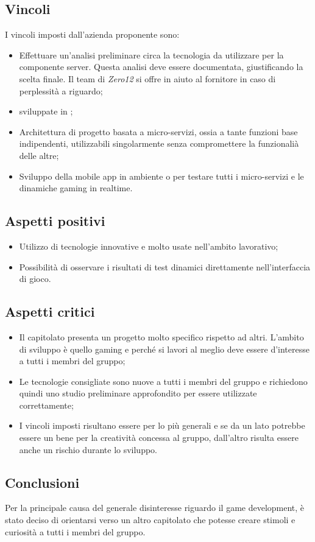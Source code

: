 \subsection{Vincoli}
I vincoli imposti dall'azienda proponente sono:
\begin{itemize}
\item Effettuare un'analisi preliminare circa la tecnologia da utilizzare per la componente server. Questa analisi deve essere documentata, giustificando la scelta finale. Il team di \textit{Zero12} si offre in aiuto al fornitore in caso di perplessità a riguardo;
\item {} sviluppate in ;
\item Architettura di progetto basata a micro-servizi, ossia a tante funzioni base indipendenti, utilizzabili singolarmente senza compromettere la funzionalià delle altre;
\item Sviluppo della mobile app in ambiente  o  per testare tutti i micro-servizi e le dinamiche gaming in realtime. 
\end{itemize}

\subsection{Aspetti positivi}
\begin{itemize}
\item Utilizzo di tecnologie innovative e molto usate nell'ambito lavorativo;
\item Possibilità di osservare i risultati di test dinamici direttamente nell'interfaccia di gioco.
\end{itemize}

\subsection{Aspetti critici}
\begin{itemize}
\item Il capitolato presenta un progetto molto specifico rispetto ad altri. L'ambito di sviluppo è quello gaming e perché si lavori al meglio deve essere d'interesse a tutti i membri del gruppo;
\item Le tecnologie consigliate sono nuove a tutti i membri del gruppo e richiedono quindi uno studio preliminare approfondito per essere utilizzate correttamente;
\item I vincoli imposti risultano essere per lo più generali e se da un lato potrebbe essere un bene per la creatività concessa al gruppo, dall'altro risulta essere anche un rischio durante lo sviluppo. 
\end{itemize}

\subsection{Conclusioni}
Per la principale causa del generale disinteresse riguardo il game development, è stato deciso di orientarsi verso un altro capitolato che potesse creare stimoli e curiosità a tutti i membri del gruppo.
